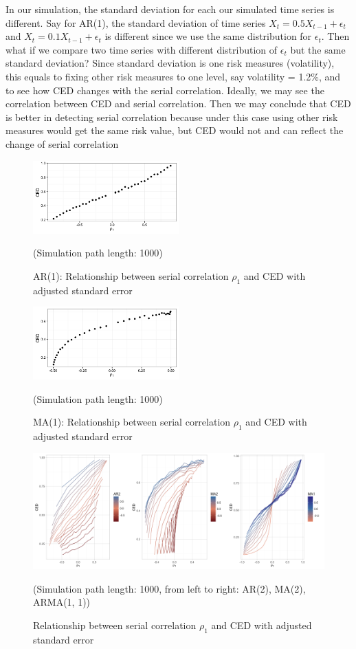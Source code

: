 \documentclass[11pt]{article}
\begin{document}
In our simulation, the standard deviation for each our simulated time series is different. Say for AR(1), the standard deviation of time series $X_t = 0.5  X_{t-1} + \epsilon_t$ and $X_t = 0.1  X_{t-1} + \epsilon_t$ is different since we use the same distribution for $\epsilon_t$. Then what if we compare two time series with different distribution of $\epsilon_t$ but the same standard deviation? Since standard deviation is one risk measures (volatility), this equals to fixing other risk measures to one level, say volatility = 1.2\%, and to see how CED changes with the serial correlation. Ideally, we may see the correlation between CED and serial correlation. Then we may conclude that CED is better in detecting serial correlation because under this case using other risk measures would get the same risk value, but CED would not and can reflect the change of serial correlation
\begin{figure}[H]
\centering
\includegraphics[width = 0.5\textwidth]{../figures/simulation/AR1_adjsd}
\caption{AR(1): Relationship between serial correlation $\rho_1$ and CED with adjusted standard error}
(Simulation path length: 1000)
\label{fig:AR1_adjsd}
\end{figure}

\begin{figure}[H]
\centering
\includegraphics[width = 0.5\textwidth]{../figures/simulation/MA1_adjsd}
\caption{MA(1): Relationship between serial correlation $\rho_1$ and CED with adjusted standard error}
(Simulation path length: 1000)
\label{fig:MA1_adjsd}
\end{figure}

\begin{figure}[H]
\centering
\includegraphics[width = 1\textwidth]{../figures/simulation/aggregated_adjsd}
\caption{Relationship between serial correlation $\rho_1$ and CED with adjusted standard error}
(Simulation path length: 1000, from left to right: AR(2), MA(2), ARMA(1, 1))
\label{fig:aggregated_adjsd}
\end{figure}
\end{document}
